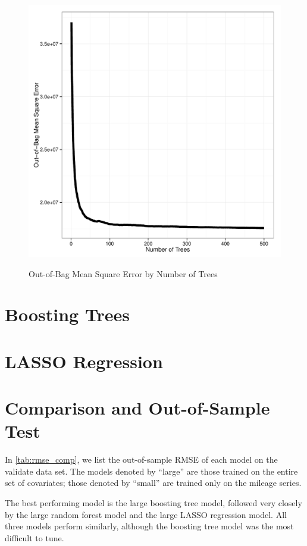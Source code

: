 \documentclass[11pt, fleqn]{article}
\begin{document}
\begin{figure}[!htb]
  \centering
  \caption{Out-of-Bag Mean Square Error by Number of Trees}
  \includegraphics[scale=.5]{rf_oob_mse.pdf}
  \label{fig:rf_oob_mse}
\end{figure}

\section{Boosting Trees}

\section{LASSO Regression}

\section{Comparison and Out-of-Sample Test}

In \cref{tab:rmse_comp}, we list the out-of-sample RMSE of each model on the validate data set. The models denoted by ``large'' are those trained on the entire set of covariates; those denoted by ``small'' are trained only on the mileage series.

The best performing model is the large boosting tree model, followed very closely by the large random forest model and the large LASSO regression model. All three models perform similarly, although the boosting tree model was the most difficult to tune.


\end{document}
